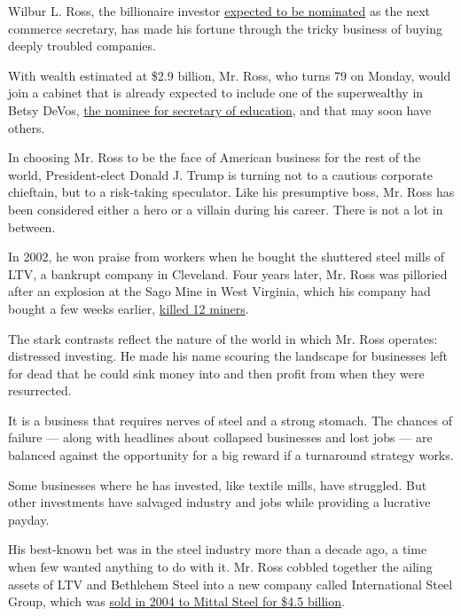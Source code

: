 Wilbur L. Ross, the billionaire investor
\href{http://www.nytimes.com/2016/11/24/us/politics/wilbur-ross-commerce-trump.html}{expected
to be nominated} as the next commerce secretary, has made his fortune
through the tricky business of buying deeply troubled companies.

With wealth estimated at \$2.9 billion, Mr. Ross, who turns 79 on
Monday, would join a cabinet that is already expected to include one of
the superwealthy in Betsy DeVos,
\href{http://www.nytimes.com/2016/11/23/us/politics/betsy-devos-trumps-education-pick-has-steered-money-from-public-schools.html}{the
nominee for secretary of education}, and that may soon have others.

In choosing Mr. Ross to be the face of American business for the rest of
the world, President-elect Donald J. Trump is turning not to a cautious
corporate chieftain, but to a risk-taking speculator. Like his
presumptive boss, Mr. Ross has been considered either a hero or a
villain during his career. There is not a lot in between.

In 2002, he won praise from workers when he bought the shuttered steel
mills of LTV, a bankrupt company in Cleveland. Four years later, Mr.
Ross was pilloried after an explosion at the Sago Mine in West Virginia,
which his company had bought a few weeks earlier,
\href{http://www.nytimes.com/2006/05/03/us/03mine.html}{killed 12
miners}.

The stark contrasts reflect the nature of the world in which Mr. Ross
operates: distressed investing. He made his name scouring the landscape
for businesses left for dead that he could sink money into and then
profit from when they were resurrected.

It is a business that requires nerves of steel and a strong stomach. The
chances of failure --- along with headlines about collapsed businesses
and lost jobs --- are balanced against the opportunity for a big reward
if a turnaround strategy works.

Some businesses where he has invested, like textile mills, have
struggled. But other investments have salvaged industry and jobs while
providing a lucrative payday.

His best-known bet was in the steel industry more than a decade ago, a
time when few wanted anything to do with it. Mr. Ross cobbled together
the ailing assets of LTV and Bethlehem Steel into a new company called
International Steel Group, which was
\href{http://www.nytimes.com/2004/10/26/business/worldbusiness/mergers-show-steel-industry-is-still-worthy-of-big.html}{sold
in 2004 to Mittal Steel for \$4.5 billion}.

